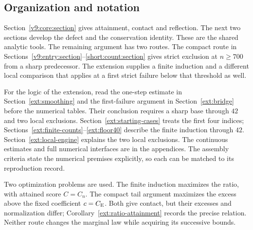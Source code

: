\subsection{Organization and notation}\label{ms:guide}\label{ms:notation}
Section~\ref{v9:core:section} gives attainment, contact and reflection.
The next two sections develop the defect and the conservation identity.
These are the shared analytic tools. The remaining argument has two routes.
The compact route in Sections~\ref{v9:entry:section}--\ref{short:count:section}
gives strict exclusion at $n\ge700$ from a sharp predecessor.
The extension supplies a finite induction and a different local comparison
that applies at a first strict failure below that threshold as well.

For the logic of the extension, read the one-step estimate in
Section~\ref{ext:smoothing} and the first-failure argument in
Section~\ref{ext:bridge} before the numerical tables. Their conclusion
requires a sharp base through $42$ and two local exclusions.
Section~\ref{ext:starting-cases} treats the first four indices;
Sections~\ref{ext:finite-counts}--\ref{ext:floor40} describe the finite
induction through $42$. Section~\ref{ext:local-engine} explains the two
local exclusions. The continuous estimates and full numerical interfaces
are in the appendices. The assembly criteria state the numerical premises
explicitly, so each can be matched to its reproduction record.

Two optimization problems are used. The finite induction maximizes the
ratio, with attained score $C=C_n$. The compact tail argument maximizes
the excess above the fixed coefficient $c=C_{\mathrm E}$. Both give contact,
but their excesses and normalization differ; Corollary~\ref{ext:ratio-attainment}
records the precise relation. Neither route changes the marginal law
while acquiring its successive bounds.

